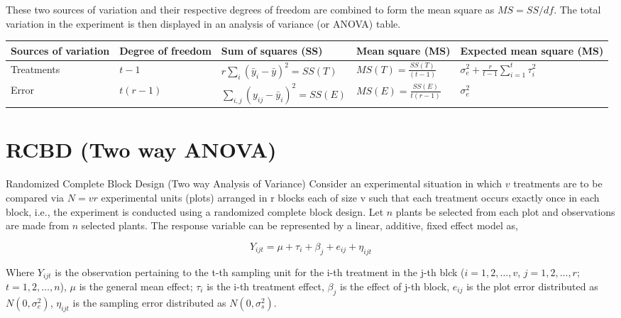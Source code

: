 \documentclass[
  ignorenonframetext,
  aspectratio=169]{beamer}
\begin{document}
\begin{frame}{}
\protect\hypertarget{section-3}{}
These two sources of variation and their respective degrees of freedom
are combined to form the mean square as \(MS = SS/df\). The total
variation in the experiment is then displayed in an analysis of variance
(or ANOVA) table.

\begin{table}
\centering\begingroup\fontsize{8}{10}\selectfont

\begin{tabular}{>{\raggedright\arraybackslash}p{6em}>{\raggedright\arraybackslash}p{5em}>{\raggedright\arraybackslash}p{8em}>{\raggedright\arraybackslash}p{6em}>{\raggedright\arraybackslash}p{8em}}
\toprule
Sources of variation & Degree of freedom & Sum of squares (SS) & Mean square (MS) & Expected mean square (MS)\\
\midrule
Treatments & $t-1$ & $r \sum_i (\bar{y}_i - \bar{y})^2 = SS(T)$ & $MS(T) = \frac{SS(T)}{(t-1)}$ & $\sigma_e^2 + \frac{r}{t-1} \sum_{i = 1}^t \tau_i^2$\\
Error & $t(r-1)$ & $\sum_{i,j} (y_{ij} - \bar{y}_i)^2 = SS(E)$ & $MS(E) = \frac{SS(E)}{t(r-1)}$ & $\sigma_e^2$\\
\bottomrule
\end{tabular}
\endgroup{}
\end{table}
\end{frame}

\hypertarget{rcbd-two-way-anova}{%
\section{RCBD (Two way ANOVA)}\label{rcbd-two-way-anova}}

\begin{frame}{Randomized Complete Block Design (Two way Analysis of
Variance)}
\protect\hypertarget{randomized-complete-block-design-two-way-analysis-of-variance}{}
Consider an experimental situation in which \(v\) treatments are to be
compared via \(N = vr\) experimental units (plots) arranged in r blocks
each of size v such that each treatment occurs exactly once in each
block, i.e., the experiment is conducted using a randomized complete
block design. Let \(n\) plants be selected from each plot and
observations are made from \(n\) selected plants. The response variable
can be represented by a linear, additive, fixed effect model as,

\[
Y_{ijt} = \mu + \tau_i + \beta_j + e_{ij} + \eta_{ijt}
\]

Where \(Y_{ijt}\) is the observation pertaining to the t-th sampling
unit for the i-th treatment in the j-th blck (\(i = 1, 2, \ldots, v\),
\(j = 1, 2, \ldots, r\); \(t = 1, 2, \ldots, n\)), \(\mu\) is the
general mean effect; \(\tau_i\) is the i-th treatment effect,
\(\beta_j\) is the effect of j-th block, \(e_{ij}\) is the plot error
distributed as \(N(0, \sigma_e^2)\), \(\eta_{ijt}\) is the sampling
error distributed as \(N(0, \sigma_s^2)\).
\end{frame}
\end{document}
